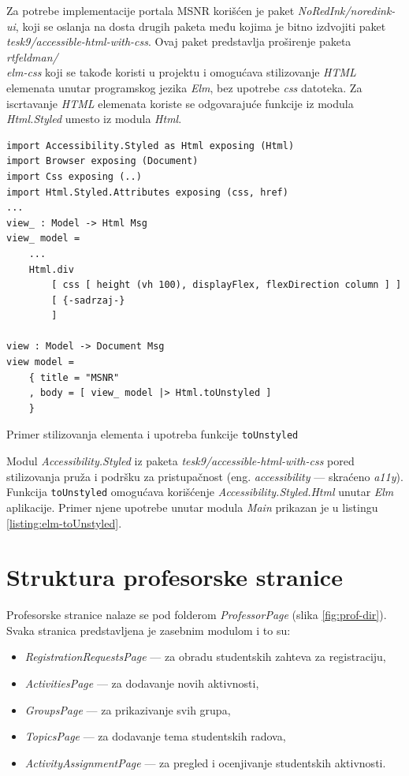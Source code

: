 \documentclass[12pt,oneside]{memoir}
\begin{document}
Za potrebe implementacije portala MSNR korišćen je paket \emph{NoRedInk/noredink-ui},
koji se oslanja na dosta drugih paketa među kojima je bitno izdvojiti paket 
\emph{tesk9/accessible-html-with-css}.
Ovaj paket predstavlja proširenje paketa \emph{rtfeldman/\\elm-css} koji se takođe koristi u projektu
i omogućava stilizovanje \emph{HTML} elemenata unutar programskog jezika \emph{Elm}, bez upotrebe
\emph{css} datoteka. Za iscrtavanje \emph{HTML} elemenata koriste se odgovarajuće funkcije iz
modula \emph{Html.Styled} umesto iz modula \emph{Html}.

\begin{listing}[h]
\begin{verbatim}
import Accessibility.Styled as Html exposing (Html)
import Browser exposing (Document)
import Css exposing (..)
import Html.Styled.Attributes exposing (css, href)
...
view_ : Model -> Html Msg
view_ model =
    ... 
    Html.div
        [ css [ height (vh 100), displayFlex, flexDirection column ] ]
        [ {-sadrzaj-}
        ]

view : Model -> Document Msg
view model =
    { title = "MSNR"
    , body = [ view_ model |> Html.toUnstyled ]
    }
\end{verbatim}
\caption{Primer stilizovanja elementa i upotreba funkcije \texttt{toUnstyled}}
\label{listing:elm-toUnstyled}
\end{listing}

Modul \emph{Accessibility.Styled} iz paketa \emph{tesk9/accessible-html-with-css} pored stilizovanja pruža i podršku za pristupačnost \cite{a11y}
(eng. \emph{accessibility} --- skraćeno \emph{a11y}). Funkcija \texttt{toUnstyled} omogućava korišćenje \emph{Accessibility.Styled.Html} unutar \emph{Elm} aplikacije.
Primer njene upotrebe unutar modula \emph{Main} prikazan je u listingu \ref{listing:elm-toUnstyled}.

\section{Struktura profesorske stranice}
Profesorske stranice nalaze se pod folderom \emph{ProfessorPage} (slika \ref{fig:prof-dir}).
Svaka stranica predstavljena je zasebnim modulom i to su:
\begin{itemize}
  \item \emph{RegistrationRequestsPage} --- za obradu studentskih zahteva za registraciju,
  \item \emph{ActivitiesPage} --- za dodavanje novih aktivnosti,
  \item \emph{GroupsPage} --- za prikazivanje svih grupa,
  \item \emph{TopicsPage} --- za dodavanje tema studentskih radova,
  \item \emph{ActivityAssignmentPage} --- za pregled i ocenjivanje studentskih aktivnosti.
\end{itemize}
\end{document}
